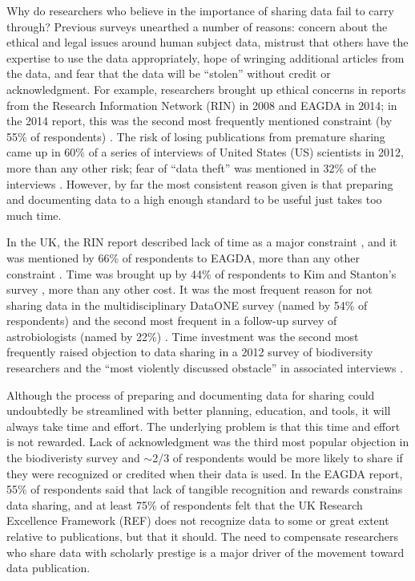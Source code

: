 \documentclass[10pt]{article}
\begin{document}
Why do researchers who believe in the importance of sharing data fail to carry through?
Previous surveys unearthed a number of reasons: concern about the ethical and legal issues around human subject data, mistrust that others have the expertise to use the data appropriately, hope of wringing additional articles from the data, and fear that the data will be ``stolen'' without credit or acknowledgment.
For example, researchers brought up ethical concerns in reports from the Research Information Network (RIN) in 2008 and EAGDA in 2014; in the 2014 report, this was the second most frequently mentioned constraint (by 55\% of respondents) \cite{swan_share_2008, bobrow_establishing_2014}.
The risk of losing publications from premature sharing came up in 60\% of a series of interviews of United States (US) scientists in 2012, more than any other risk; fear of ``data theft'' was mentioned in 32\% of the interviews \cite{kim_institutional_2012}.
However, by far the most consistent reason given is that preparing and documenting data to a high enough standard to be useful just takes too much time.

In the UK, the RIN report described lack of time as a major constraint \cite{swan_share_2008}, and it was mentioned by 66\% of respondents to EAGDA, more than any other constraint \cite{bobrow_establishing_2014}.
Time was brought up by 44\% of respondents to Kim and Stanton's survey \cite{kim_institutional_2012}, more than any other cost.
It was the most frequent reason for not sharing data in the multidisciplinary DataONE survey (named by 54\% of respondents) \cite{tenopir_data_2011} and the second most frequent in a follow-up survey of astrobiologists (named by 22\%) \cite{aydinoglu_data_2014}.
Time investment was the second most frequently raised objection to data sharing in a 2012 survey of biodiversity researchers and the ``most violently discussed obstacle'' in associated interviews \cite{enke_users_2012}.

Although the process of preparing and documenting data for sharing could undoubtedly be streamlined with better planning, education, and tools, it will always take time and effort.
The underlying problem is that this time and effort is not rewarded.
Lack of acknowledgment was the third most popular objection in the biodiveristy survey and $\sim$2/3 of respondents would be more likely to share if they were recognized or credited when their data is used.
In the EAGDA report, 55\% of respondents said that lack of tangible recognition and rewards constrains data sharing, and at least 75\% of respondents felt that the UK Research Excellence Framework (REF) does not recognize data to some or great extent relative to publications, but that it should.
The need to compensate researchers who share data with scholarly prestige is a major driver of the movement toward data publication.
\end{document}
